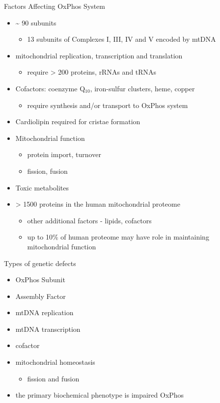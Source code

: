 \documentclass[presentation, smaller]{beamer}
\begin{document}
\begin{frame}[label={sec:org43481ca}]{Factors Affecting OxPhos System}
\begin{itemize}
\item \textasciitilde{} 90 subunits
\begin{itemize}
\item 13 subunits of Complexes I, III, IV and V encoded by mtDNA
\end{itemize}
\item mitochondrial replication, transcription and translation
\begin{itemize}
\item require \textgreater{} 200 proteins, rRNAs and tRNAs
\end{itemize}
\item Cofactors: coenzyme Q\(_{\text{10}}\), iron-sulfur clusters, heme, copper
\begin{itemize}
\item require synthesis and/or transport to OxPhos system
\end{itemize}
\item Cardiolipin required for cristae formation
\item Mitochondrial function
\begin{itemize}
\item protein import, turnover
\item fission, fusion
\end{itemize}
\item Toxic metabolites
\item \textgreater{} 1500 proteins in the human mitochondrial proteome
\begin{itemize}
\item other additional factors - lipids, cofactors
\item up to 10\% of human proteome may have role in maintaining mitochondrial function
\end{itemize}
\end{itemize}
\end{frame}

\begin{frame}[label={sec:org7c035c3}]{Types of genetic defects}
\begin{itemize}
\item OxPhos Subunit
\item Assembly Factor
\item mtDNA replication
\item mtDNA transcription
\item cofactor
\item mitochondrial homeostasis
\begin{itemize}
\item fission and fusion
\end{itemize}
\item the primary biochemical phenotype is impaired OxPhos
\end{itemize}
\end{frame}
\end{document}
